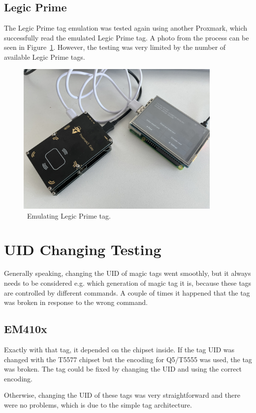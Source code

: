 \subsection{Legic Prime}

The Legic Prime tag emulation was tested again using another Proxmark, which successfully read the emulated Legic Prime tag. A photo from the process can be seen in Figure~\ref{fig:legicemulation}. However, the testing was very limited by the number of available Legic Prime tags. 

\begin{figure}[ht]
  \centering
  \includegraphics[width=10cm]{text/testing/emulating_legic.JPEG}
  \caption{~Emulating Legic Prime tag.}
  \label{fig:legicemulation}
\end{figure}


\section{UID Changing Testing}
Generally speaking, changing the UID of magic tags went smoothly, but it always needs to be considered e.g. which generation of magic tag it is, because these tags are controlled by different commands. A couple of times it happened that the tag was broken in response to the wrong command.

\subsection{EM410x}
Exactly with that tag, it depended on the chipset inside. If the tag UID was changed with the T5577 chipset but the encoding for Q5/T5555 was used, the tag was broken. The tag could be fixed by changing the UID and using the correct encoding.

Otherwise, changing the UID of these tags was very straightforward and there were no problems, which is due to the simple tag architecture.


